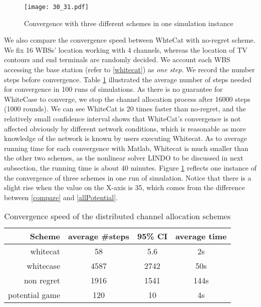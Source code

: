 

\begin{figure}[h!]
  \centering
  \texttt{[image: 30\_31.pdf]}
  \caption{Convergence with three different schemes in one simulation instance}
\label{convergeComp}
\end{figure}


We also compare the convergence speed between WhteCat with no-regret scheme. We fix 16 WBSs' location working with 4 channels, whereas the location of TV contours and end terminals are randomly decided. We account each WBS accessing the base station (refer to \ref{whitecat}) as \textit{one step}. We record the number steps before convergence. Table \ref{convergencespeed} illustrated the average number of steps needed for convergence in 100 runs of simulations. As there is no guarantee for WhiteCase to converge, we stop the channel allocation process after 16000 steps (1000 rounds). We can see WhiteCat is 20 times faster than no-regret, and the relatively small confidence interval shows that WhiteCat's convergence is not affected obviously by different network conditions, which is reasonable as more knowledge of the network is known by users executing Whitecat. As to average running time for each convergence with Matlab, Whitecat is much smaller than the other two schemes, as the nonlinear solver LINDO to be discussed in next subsection, the running time is about 40 minutes. Figure \ref{convergeComp} reflects one instance of the convergence of three schemes in one run of simulation. Notice that there is a slight rise when the value on the X-axis is 35, which comes from the difference between \ref{compare} and \ref{allPotential}.

\begin{table}[!h]
\caption{Convergence speed of the distributed channel allocation schemes}\label{convergencespeed}
\centering
\begin{tabular}{|r|c|c|c|}
  \hline
  Scheme			 						& average \#steps 	 		& 95\% CI			&average time\\
    \hline
  whitecat									& 58											& 5.6						&2s\\\hline
  whitecase 								& 4587 											& 2742						&50s\\\hline %
  non regret									& 1916											& 1541						&144s\\\hline
  potential game 							& 120							& 10										&4s\\
  \hline
\end{tabular}
\end{table}


